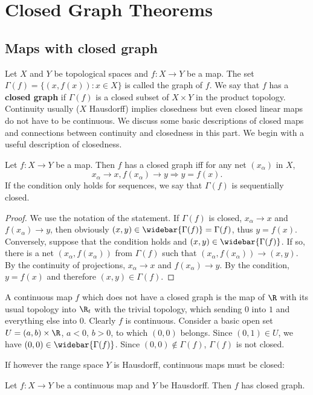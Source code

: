 \chapter{Closed Graph Theorems}
\section{Maps with closed graph}
Let $X$ and $Y$ be topological spaces and $f:X\to Y$ be a map. The set $\Gamma(f)=\{(x,f(x)):x\in X\}$ is called the graph of $f$. We say that $f$ has a \textbf{closed graph} if $\Gamma(f)$ is a closed subset of $X\times Y$ in the product topology. Continuity usually ($X$ Hausdorff) implies closedness but even closed linear maps do not have to be continuous. We discuss some basic descriptions of closed maps and connections between continuity and closedness in this part. We begin with a useful description of closedness.
\begin{proposition}\label{closed graph iff}
Let $f:X\to Y$ be a map. Then $f$ has a closed graph iff for any net $(x_\alpha)$ in $X$,
\[x_\alpha\to x,f(x_\alpha)\to y\Longrightarrow y=f(x).\]
If the condition only holds for sequences, we say that $\Gamma(f)$ is sequentially closed.
\end{proposition}
\begin{proof}
We use the notation of the statement. If $\Gamma(f)$ is closed, $x_\alpha\to x$ and $f(x_\alpha)\to y$, then obviously $(x,y)\in\widebar{\Gamma(f)}=\Gamma(f)$, thus $y=f(x)$. Conversely, suppose that the condition holds and $(x,y)\in\widebar{\Gamma(f)}$. If so, there is a net
$(x_\alpha,f(x_\alpha))$ from $\Gamma(f)$ such that $(x_\alpha,f(x_\alpha))\to(x,y)$. By the continuity of projections, $x_\alpha\to x$ and $f(x_\alpha)\to y$. By the condition, $y=f(x)$ and therefore $(x,y)\in\Gamma(f)$.
\end{proof}
\begin{example}
A continuous map $f$ which does not have a closed graph is the map of $\R$ with its usual topology into $\R_t$ with the trivial topology, which sending $0$ into $1$ and everything else into $0$. Clearly $f$ is continuous. Consider a basic open set $U=(a,b)\times\R$, $a<0$, $b>0$, to which $(0,0)$ belongs. Since $(0,1)\in U$, we have $(0,0)\in\widebar{\Gamma(f)}$. Since $(0,0)\notin\Gamma(f)$, $\Gamma(f)$ is not closed. 
\end{example}
If however the range space $Y$ is Hausdorff, continuous maps must be closed:
\begin{proposition}\label{closed graph continuous map if Hausdorff}
Let $f:X\to Y$ be a continuous map and $Y$ be Hausdorff. Then $f$ has closed graph.
\end{proposition} 
